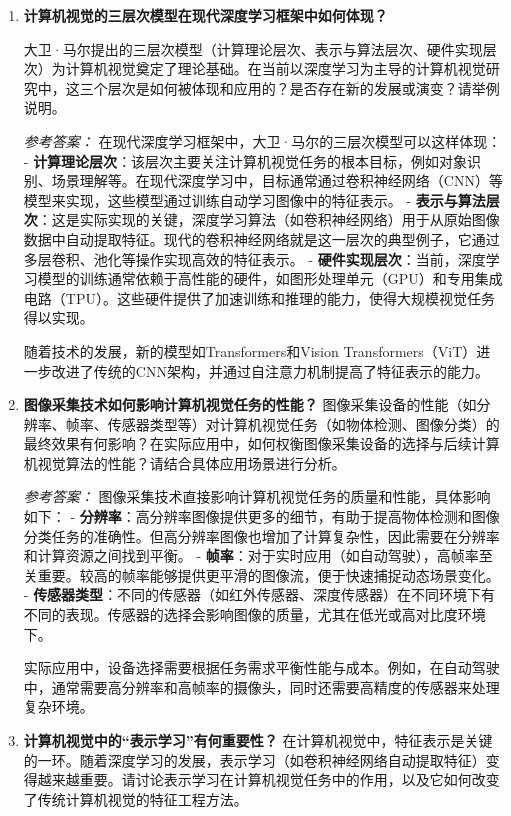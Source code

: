\begin{enumerate}
    \item \textbf{计算机视觉的三层次模型在现代深度学习框架中如何体现？}  

    大卫·马尔提出的三层次模型（计算理论层次、表示与算法层次、硬件实现层次）为计算机视觉奠定了理论基础。在当前以深度学习为主导的计算机视觉研究中，这三个层次是如何被体现和应用的？是否存在新的发展或演变？请举例说明。

    
    \textit{参考答案：}  
    在现代深度学习框架中，大卫·马尔的三层次模型可以这样体现：
    - \textbf{计算理论层次}：该层次主要关注计算机视觉任务的根本目标，例如对象识别、场景理解等。在现代深度学习中，目标通常通过卷积神经网络（CNN）等模型来实现，这些模型通过训练自动学习图像中的特征表示。
    - \textbf{表示与算法层次}：这是实际实现的关键，深度学习算法（如卷积神经网络）用于从原始图像数据中自动提取特征。现代的卷积神经网络就是这一层次的典型例子，它通过多层卷积、池化等操作实现高效的特征表示。
    - \textbf{硬件实现层次}：当前，深度学习模型的训练通常依赖于高性能的硬件，如图形处理单元（GPU）和专用集成电路（TPU）。这些硬件提供了加速训练和推理的能力，使得大规模视觉任务得以实现。

    随着技术的发展，新的模型如Transformers和Vision Transformers（ViT）进一步改进了传统的CNN架构，并通过自注意力机制提高了特征表示的能力。

    \item \textbf{图像采集技术如何影响计算机视觉任务的性能？}  
    图像采集设备的性能（如分辨率、帧率、传感器类型等）对计算机视觉任务（如物体检测、图像分类）的最终效果有何影响？在实际应用中，如何权衡图像采集设备的选择与后续计算机视觉算法的性能？请结合具体应用场景进行分析。

    
    \textit{参考答案：}  
    图像采集技术直接影响计算机视觉任务的质量和性能，具体影响如下：
    - \textbf{分辨率}：高分辨率图像提供更多的细节，有助于提高物体检测和图像分类任务的准确性。但高分辨率图像也增加了计算复杂性，因此需要在分辨率和计算资源之间找到平衡。
    - \textbf{帧率}：对于实时应用（如自动驾驶），高帧率至关重要。较高的帧率能够提供更平滑的图像流，便于快速捕捉动态场景变化。
    - \textbf{传感器类型}：不同的传感器（如红外传感器、深度传感器）在不同环境下有不同的表现。传感器的选择会影响图像的质量，尤其在低光或高对比度环境下。

    实际应用中，设备选择需要根据任务需求平衡性能与成本。例如，在自动驾驶中，通常需要高分辨率和高帧率的摄像头，同时还需要高精度的传感器来处理复杂环境。

    \item \textbf{计算机视觉中的“表示学习”有何重要性？}  
    在计算机视觉中，特征表示是关键的一环。随着深度学习的发展，表示学习（如卷积神经网络自动提取特征）变得越来越重要。请讨论表示学习在计算机视觉任务中的作用，以及它如何改变了传统计算机视觉的特征工程方法。
 

\end{enumerate}
